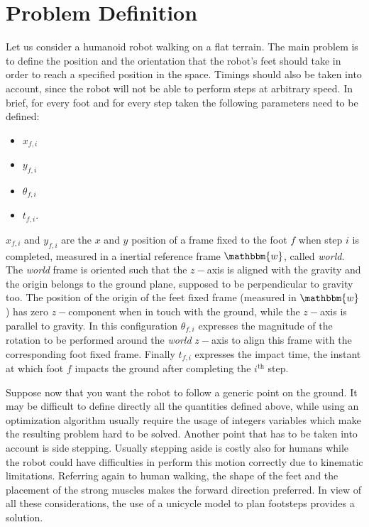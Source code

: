 \section{Problem Definition}
Let us consider a humanoid robot walking on a flat terrain. The main problem is to define the position and the orientation that the robot's feet should take in order to reach a specified position in the space. Timings should also be taken into account, since the robot will not be able to perform steps at arbitrary speed. In brief, for every foot and for every step taken the following parameters need to be defined:
\begin{itemize}
	\item $x_{f, i}$
	\item $y_{f, i}$
	\item $\theta_{f, i}$
	\item $t_{f, i}$.
\end{itemize}
$x_{f, i}$ and $y_{f, i}$ are the $x$ and $y$ position of a frame fixed to the foot $f$ when step $i$ is completed, measured in a inertial reference frame $\mathbbm{w}$, called \textit{world}. The \textit{world} frame is oriented such that the $z-$axis is aligned with the gravity and the origin belongs to the ground plane, supposed to be perpendicular to gravity too. The position of the origin of the feet fixed frame (measured in $\mathbbm{w}$) has zero $z-$component when in touch with the ground, while the $z-$axis is parallel to gravity. In this configuration $\theta_{f, i}$ expresses the magnitude of the rotation to be performed around the \textit{world} $z-$axis to align this frame with the corresponding foot fixed frame. Finally $t_{f, i}$ expresses the impact time, the instant at which foot $f$ impacts the ground after completing the $i^\text{th}$ step.

Suppose now that you want the robot to follow a generic point on the ground. It may be difficult to define directly all the quantities defined above, while using an optimization algorithm usually require the usage of integers variables which make the resulting problem hard to be solved. Another point that has to be taken into account is side stepping. Usually stepping aside is costly also for humans \cite{handford2014sideways} while the robot could have difficulties in perform this motion correctly due to kinematic limitations. 
Referring again to human walking, the shape of the feet and the placement of the strong muscles makes the forward direction preferred. In view of all these considerations, the use of a unicycle model to plan footsteps provides a solution.